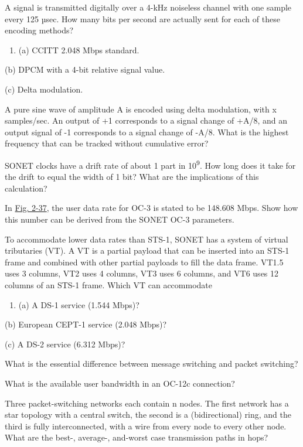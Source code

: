 A signal is transmitted digitally over a 4-kHz noiseless channel with
one sample every 125 µsec{.} How many bits per second are actually sent
for each of these encoding methods?

\begin{enumerate}
\def\labelenumi{\alph{enumi}.}
\item
  {}

  (a) CCITT 2.048 Mbps standard.
\end{enumerate}

(b) DPCM with a 4-bit relative signal value.

(c) Delta modulation.

A pure sine wave of amplitude {A} is encoded using delta modulation,
with {x} samples/sec. An output of +1 corresponds to a signal change of
+{A/}8, and an output signal of -1 corresponds to a signal change of
-{A/}8{.} What is the highest frequency that can be tracked without
cumulative error?

SONET clocks have a drift rate of about 1 part in 10\textsuperscript{9}.
How long does it take for the drift to equal the width of 1 bit? What
are the implications of this calculation?

In
\protect\hyperlink{0130661023_ch02lev1sec5.htmlux5cux23ch02fig37}{Fig.
2-37}, the user data rate for OC-3 is stated to be 148.608 Mbps. Show
how this number can be derived from the SONET OC-3 parameters.

To accommodate lower data rates than STS-1, SONET has a system of
virtual tributaries (VT). A VT is a partial payload that can be inserted
into an STS-1 frame and combined with other partial payloads to fill the
data frame. VT1.5 uses 3 columns, VT2 uses 4 columns, VT3 uses 6
columns, and VT6 uses 12 columns of an STS-1 frame. Which VT can
accommodate

\begin{enumerate}
\def\labelenumi{\alph{enumi}.}
\item
  {}

  (a) A DS-1 service (1.544 Mbps)?
\end{enumerate}

(b) European CEPT-1 service (2.048 Mbps)?

(c) A DS-2 service (6.312 Mbps)?

What is the essential difference between message switching and packet
switching?

What is the available user bandwidth in an OC-12c connection?

Three packet-switching networks each contain {n} nodes. The first
network has a star topology with a central switch, the second is a
(bidirectional) ring, and the third is fully interconnected, with a wire
from every node to every other node. What are the best-, average-,
and-worst case transmission paths in hops?


